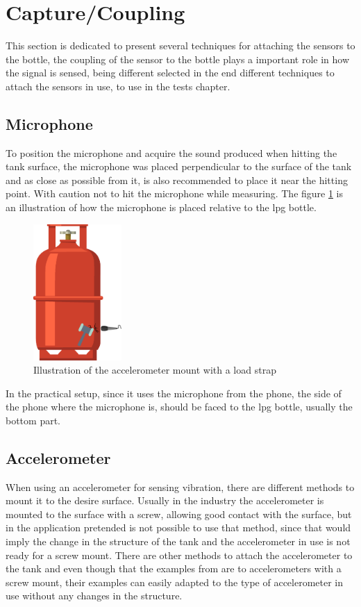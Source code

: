 \section{Capture/Coupling}\label{sec:CaptureCoupling}
This section is dedicated to present several techniques for attaching the sensors to the bottle, the coupling of the sensor to the bottle plays a important role in how the signal is sensed, being different selected in the end different techniques to attach the sensors in use, to use in the tests chapter.
\subsection{Microphone}
To position the microphone and acquire the sound produced when hitting the tank surface, the microphone was placed perpendicular to the surface of the tank and as close as possible from it, is also recommended to place it near the hitting point. With caution not to hit the microphone while measuring. The figure \ref{fig:micmount} is an illustration of how the microphone is placed relative to the \acrshort{lpg} bottle.
\begin{figure}[]
    \centering
    \includegraphics[width=0.3\textwidth]{Chapters/4CHP/Figures/micWimpactHamm.eps}
    \caption{Illustration of the accelerometer mount with a load strap}
    \label{fig:micmount}
\end{figure}
In the practical setup, since it uses the microphone from the phone, the side of the phone where the microphone is, should be faced to the \acrshort{lpg} bottle, usually the bottom part.
\subsection{Accelerometer}
When using an accelerometer for sensing vibration, there are different methods to mount it to the desire surface. Usually in the industry the accelerometer is mounted to the surface with a screw, allowing good contact with the surface, but in the application pretended is not possible to use that method, since that would imply the change in the structure of the tank and the accelerometer in use is not ready for a screw mount. There are other methods to attach the accelerometer to the tank and even though that the examples from \cite{GuidelinesMountingTest} are to accelerometers with a screw mount, their examples can easily adapted to the type of accelerometer in use without any changes in the structure.

